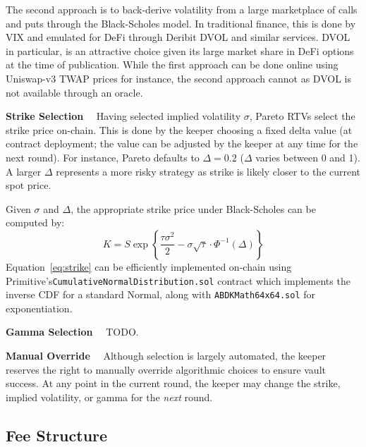 \documentclass[hidelinks, 12pt]{article}
\begin{document}

The second approach is to back-derive volatility from a large marketplace of calls and puts through the Black-Scholes model. 
In traditional finance, this is done by VIX and emulated for DeFi through Deribit DVOL and similar services.
DVOL in particular, is an attractive choice given its large market share in DeFi options at the time of publication.
While the first approach can be done online using Uniswap-v3 TWAP prices for instance, the second approach cannot as DVOL is not available through an oracle. 

\textbf{Strike Selection}$\quad$ Having selected implied volatility $\sigma$, Pareto RTVs select the strike price on-chain. 
This is done by the keeper choosing a fixed delta value (at contract deployment; the value can be adjusted by the keeper at any time for the next round). For instance, Pareto defaults to $\Delta = 0.2$ ($\Delta$ varies between 0 and 1). 
A larger $\Delta$  represents a more risky strategy as strike is likely closer to the current spot price. 

Given $\sigma$ and $\Delta$, the appropriate strike price under Black-Scholes can be computed by: 
\begin{equation}
  K = S \exp \left\{ \frac{\tau \sigma^2}{2} - \sigma \sqrt{\tau} \cdot \Phi^{-1}(\Delta) \right\}
  \label{eq:strike}
\end{equation}
Equation~\ref{eq:strike} can be efficiently implemented on-chain using Primitive's\newline \texttt{CumulativeNormalDistribution.sol} contract which implements the inverse CDF for a standard Normal, along with \texttt{ABDKMath64x64.sol} for exponentiation.


\textbf{Gamma Selection}$\quad$ TODO.

\textbf{Manual Override}$\quad$ Although selection is largely automated, the keeper reserves the right to manually override algorithmic choices to ensure vault success. At any point in the current round, the keeper may change the strike, implied volatility, or gamma for the \textit{next} round.


\subsection{Fee Structure}
\label{sec:fees}
\end{document}

